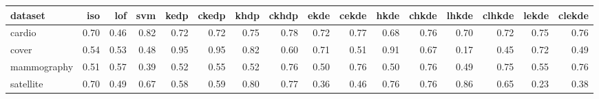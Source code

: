 \begin{table}[ht]
\centering
\begin{tabular}{lrrrrrrrrrrrrrrr}
  \hline
dataset & iso & lof & svm & kedp & ckedp & khdp & ckhdp & ekde & cekde & hkde & chkde & lhkde & clhkde & lekde & clekde \\ 
  \hline
cardio & 0.70 & 0.46 & 0.82 & 0.72 & 0.72 & 0.75 & 0.78 & 0.72 & 0.77 & 0.68 & 0.76 & 0.70 & 0.72 & 0.75 & 0.76 \\ 
  cover & 0.54 & 0.53 & 0.48 & 0.95 & 0.95 & 0.82 & 0.60 & 0.71 & 0.51 & 0.91 & 0.67 & 0.17 & 0.45 & 0.72 & 0.49 \\ 
  mammography & 0.51 & 0.57 & 0.39 & 0.52 & 0.55 & 0.52 & 0.76 & 0.50 & 0.76 & 0.50 & 0.76 & 0.49 & 0.75 & 0.55 & 0.76 \\ 
  satellite & 0.70 & 0.49 & 0.67 & 0.58 & 0.59 & 0.80 & 0.77 & 0.36 & 0.46 & 0.76 & 0.76 & 0.86 & 0.65 & 0.23 & 0.38 \\ 
   \hline
\end{tabular}
\end{table}
